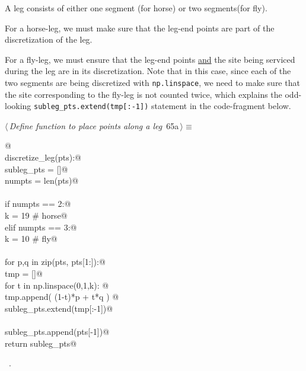 \documentclass[11.5pt]{report}
\begin{document}
A leg consists of either one segment (for horse) or two segments(for fly). 

For a horse-leg, we must make sure that the leg-end points are part of the discretization of the leg. 

For a fly-leg, we must ensure that the leg-end points \underline{and} the site being 
serviced during the leg are in its discretization. Note that in this case, 
since each of the two segments are being discretized with \verb|np.linspace|, we need
to make sure that the site corresponding to the fly-leg is not counted twice, which
explains the odd-looking \verb|subleg_pts.extend(tmp[:-1])| statement in the code-fragment below. 

\begin{flushleft} \small
\begin{minipage}{\linewidth}\label{scrap98}\raggedright\small
{} $\langle\,${\itshape Define function to place points along a leg}\nobreak\ {\footnotesize {65a}}$\,\rangle\equiv$
\vspace{-1ex}
\begin{list}{}{} \item
\mbox{}\verb@   @\\
\mbox{}\verb@def discretize_leg(pts):@\\
\mbox{}\verb@   subleg_pts = []@\\
\mbox{}\verb@   numpts     = len(pts)@\\
\mbox{}\verb@@\\
\mbox{}\verb@   if numpts == 2:@\\
\mbox{}\verb@       k  = 19 # horse@\\
\mbox{}\verb@   elif numpts == 3:@\\
\mbox{}\verb@       k  = 10 # fly@\\
\mbox{}\verb@@\\
\mbox{}\verb@   for p,q in zip(pts, pts[1:]):@\\
\mbox{}\verb@       tmp = []@\\
\mbox{}\verb@       for t in np.linspace(0,1,k): @\\
\mbox{}\verb@           tmp.append( (1-t)*p + t*q ) @\\
\mbox{}\verb@       subleg_pts.extend(tmp[:-1])@\\
\mbox{}\verb@@\\
\mbox{}\verb@   subleg_pts.append(pts[-1])@\\
\mbox{}\verb@   return subleg_pts@\\
\mbox{}\verb@@{\NWsep}
\end{list}
\vspace{-1.5ex}
\footnotesize
\begin{list}{}{\setlength{\itemsep}{-\parsep}\setlength{\itemindent}{-\leftmargin}}
\item \NWtxtMacroRefIn\ .

\item{}
\end{list}
\end{minipage}\vspace{4ex}
\end{flushleft}
\end{document}
